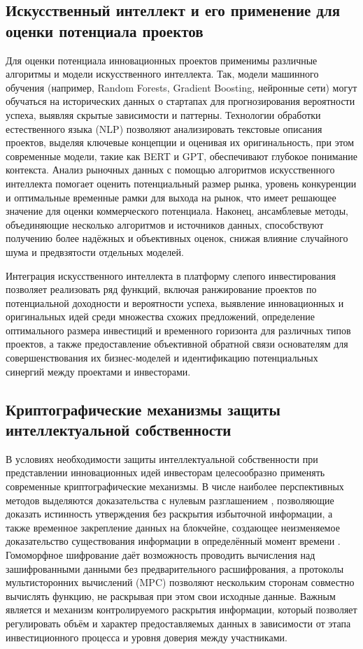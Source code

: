 \documentclass[
    candidate, %
    subf, %
    dotsinheaders=false,
]{disser}
\begin{document}
\subsection{Искусственный интеллект и его применение для оценки потенциала проектов}

Для оценки потенциала инновационных проектов применимы различные алгоритмы и модели искусственного интеллекта. Так, модели машинного обучения (например, Random Forests, Gradient Boosting, нейронные сети) могут обучаться на исторических данных о стартапах для прогнозирования вероятности успеха, выявляя скрытые зависимости и паттерны. Технологии обработки естественного языка (NLP) позволяют анализировать текстовые описания проектов, выделяя ключевые концепции и оценивая их оригинальность, при этом современные модели, такие как BERT и GPT, обеспечивают глубокое понимание контекста. Анализ рыночных данных с помощью алгоритмов искусственного интеллекта помогает оценить потенциальный размер рынка, уровень конкуренции и оптимальные временные рамки для выхода на рынок, что имеет решающее значение для оценки коммерческого потенциала. Наконец, ансамблевые методы, объединяющие несколько алгоритмов и источников данных, способствуют получению более надёжных и объективных оценок, снижая влияние случайного шума и предвзятости отдельных моделей.

Интеграция искусственного интеллекта в платформу слепого инвестирования позволяет реализовать ряд функций, включая ранжирование проектов по потенциальной доходности и вероятности успеха, выявление инновационных и оригинальных идей среди множества схожих предложений, определение оптимального размера инвестиций и временного горизонта для различных типов проектов, а также предоставление объективной обратной связи основателям для совершенствования их бизнес-моделей и идентификацию потенциальных синергий между проектами и инвесторами.

\subsection{Криптографические механизмы защиты интеллектуальной собственности}

В условиях необходимости защиты интеллектуальной собственности при представлении инновационных идей инвесторам целесообразно применять современные криптографические механизмы. В числе наиболее перспективных методов выделяются доказательства с нулевым разглашением \cite{ben2014succinct}, позволяющие доказать истинность утверждения без раскрытия избыточной информации, а также временное закрепление данных на блокчейне, создающее неизменяемое доказательство существования информации в определённый момент времени \cite{benet2014ipfs}. Гомоморфное шифрование даёт возможность проводить вычисления над зашифрованными данными без предварительного расшифрования, а протоколы мультисторонних вычислений (MPC) позволяют нескольким сторонам совместно вычислять функцию, не раскрывая при этом свои исходные данные. Важным является и механизм контролируемого раскрытия информации, который позволяет регулировать объём и характер предоставляемых данных в зависимости от этапа инвестиционного процесса и уровня доверия между участниками.
\end{document}
